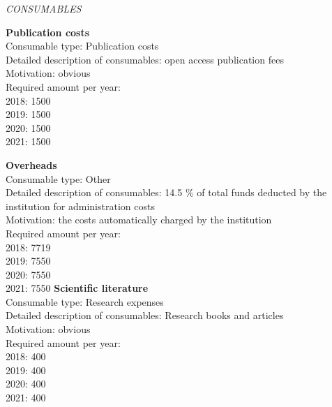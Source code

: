 \documentclass[11pt,dvipsnames,usenames,a4paper]{article}
\begin{document}

{\it CONSUMABLES}












{\bf Publication costs}\\
Consumable type: Publication costs\\
Detailed description of consumables: open access publication fees\\
Motivation: obvious\\
Required amount per year:\\
2018: 1500\\
2019: 1500\\
2020: 1500\\
2021: 1500


{\bf Overheads}\\
Consumable type: Other\\
Detailed description of consumables: 14.5 \% of total funds deducted by the institution for administration costs\\
Motivation: the costs automatically charged by the institution \\
Required amount per year:\\
2018: 7719\\
2019: 7550\\
2020: 7550\\
2021: 7550
\newpage
{\bf Scientific literature}\\
Consumable type: Research expenses\\
Detailed description of consumables: Research books and articles\\
Motivation: obvious\\
Required amount per year:\\
2018: 400\\
2019: 400\\
2020: 400\\
2021: 400
\end{document}

